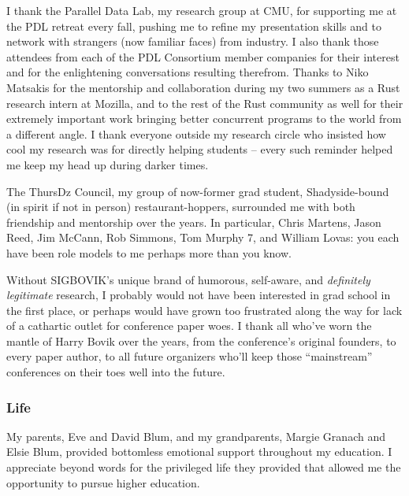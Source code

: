 \documentclass[12pt]{cmuthesis}
\begin{document}
\begin{acknowledgments}
{I thank the Parallel Data Lab, my research group at CMU,
for supporting me at the PDL retreat every fall,
pushing me to refine my presentation skills and to network with strangers (now familiar faces) from industry.
I also thank those %
attendees from each of the PDL Consortium member companies
for their interest %
and for the enlightening conversations resulting therefrom.
Thanks to Niko Matsakis for the mentorship and collaboration during my two summers as a Rust research intern at Mozilla,
and to the rest of the Rust community as well for their extremely important work
bringing better concurrent programs to the world from a different angle.
I thank everyone outside my %
research circle who
insisted how cool my research was for directly helping students --
every such reminder helped me keep my head up during darker times.

The ThursDz Council,
my group of now-former grad student, Shadyside-bound (in spirit if not in person) restaurant-hoppers,
surrounded me with both friendship and mentorship over the years.
In particular,
Chris Martens,
Jason Reed,
Jim McCann,
Rob Simmons,
Tom Murphy 7,
and
William Lovas:
you each have been role models to me
perhaps more than you know.

Without SIGBOVIK's unique brand of humorous, self-aware, and {\em definitely legitimate} research,
I probably would not have been interested in grad school in the first place,
or perhaps would have grown too frustrated along the way for lack of a cathartic outlet for conference paper woes.
I thank all who've worn the mantle of Harry Bovik over the years,
from the conference's original founders,
to every paper author,
to all future organizers who'll keep those ``mainstream'' conferences on their toes well into the future.

\subsubsection{Life}

My parents, Eve and David Blum, and my grandparents, Margie Granach and Elsie Blum,
provided bottomless emotional support throughout my education.
I appreciate beyond words for the privileged life they provided
that allowed me the opportunity to pursue higher education.

}
\end{acknowledgments}
\end{document}
